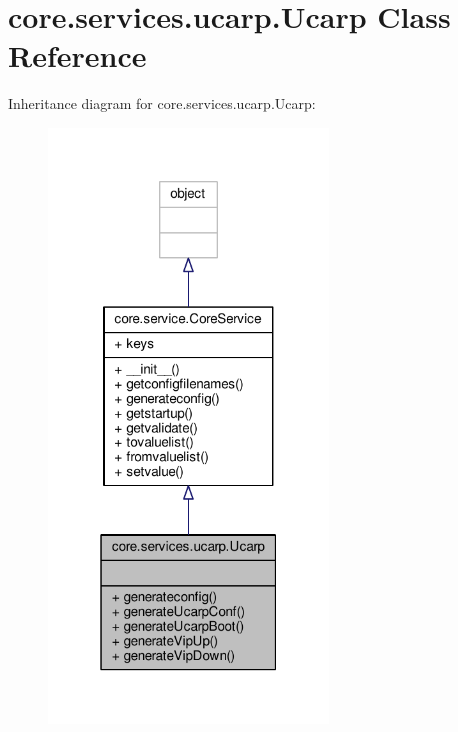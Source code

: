 \hypertarget{classcore_1_1services_1_1ucarp_1_1_ucarp}{\section{core.\+services.\+ucarp.\+Ucarp Class Reference}
\label{classcore_1_1services_1_1ucarp_1_1_ucarp}
}


Inheritance diagram for core.\+services.\+ucarp.\+Ucarp\+:
\nopagebreak
\begin{figure}[H]
\begin{center}
\leavevmode
\includegraphics[width=211pt]{classcore_1_1services_1_1ucarp_1_1_ucarp__inherit__graph}
\end{center}
\end{figure}


